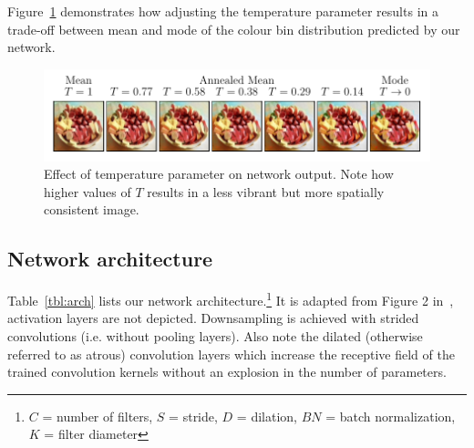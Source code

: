 \documentclass{article}
\begin{document}
Figure~\ref{fig:annealed_mean} demonstrates how adjusting the
temperature parameter results in a trade-off between mean and mode of the
colour bin distribution predicted by our network.

\begin{figure}
    \centering
    \includegraphics[width=\textwidth]{resources/annealed_mean.pdf}
    \caption{Effect of temperature parameter on network output. Note how higher
             values of $T$ results in a less vibrant but more spatially
             consistent image.}
    \label{fig:annealed_mean}
\end{figure}


\subsection{Network architecture}

Table~\ref{tbl:arch} lists our network architecture.\footnote{$C$ = number of
filters, $S$ = stride, $D$ = dilation, $BN$ = batch normalization, $K$ =
filter diameter} It is adapted from Figure 2 in~\cite{Zhang2016}, activation
layers are not depicted. Downsampling is achieved with strided convolutions
(i.e. without pooling layers). Also note the dilated (otherwise referred to as
atrous) convolution layers which increase the receptive field of the trained
convolution kernels without an explosion in the number of parameters.
\end{document}
